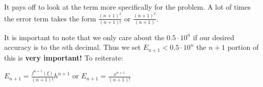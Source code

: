 It pays off to look at the term more specifically for the problem. A lot of times the
error term takes the form $\frac{(n+1)^2}{(n+1)!}$ or $\frac{(n+1)^2}{(n+1)}$.

It is important to note that we only care about the $0.5 \cdot 10^n$ if our desired
accuracy is to the $n$th decimal. Thus we set $E_{n+1} < 0.5 \cdot 10^n$ the $n+1$
portion of this is \textbf{very important!} To reiterate:

$ E_{n+1} = \frac{f^{n+1}(\xi)}{(n+1)!}h^{n+1} $ or $E_{n+1} = \frac{x^{n+1}}{(n+1)!}$\\
